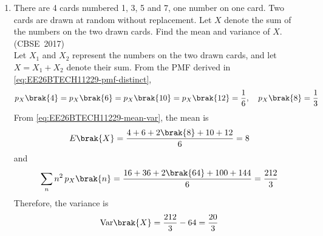 \begin{enumerate}[label=\thesubsection.\arabic*, ref=\thesubsection.\theenumi]
The following code verifies the solution
\begin{lstlisting}[frame=single, basicstyle=\rmfamily, escapeinside={(*@}{@*)}]
(*@\makebox[\dimexpr\linewidth-2\fboxsep-2\fboxrule\relax][c]{codes/triangle.py}@*)
\end{lstlisting}

\item 
There are 4 cards numbered 1, 3, 5 and 7, one number on one card. Two cards are drawn at random without replacement. Let $X$ denote the sum of the numbers on the two drawn cards. Find the mean and variance of $X$.
\hfill (CBSE~2017)
\\
\solution
Let $X_1$ and $X_2$ represent the numbers on the two drawn cards, and let $X = X_1 + X_2$ denote their sum. From the PMF derived in \eqref{eq:EE26BTECH11229-pmf-distinct},
\begin{align}
	p_X\brak{4} = p_X\brak{6} = p_X\brak{10} = p_X\brak{12} = \frac{1}{6}, \quad p_X\brak{8} = \frac{1}{3}
\end{align}
From \eqref{eq:EE26BTECH11229-mean-var}, the mean is
\begin{align}
	E\brak{X} = \frac{4 + 6 + 2\brak{8} + 10 + 12}{6} = 8
\end{align}
and
\begin{align}
	\sum_{n}n^2\,p_X\brak{n} = \frac{16 + 36 + 2\brak{64} + 100 + 144}{6} = \frac{212}{3}
\end{align}
Therefore, the variance is
\begin{align}
	\text{Var}\brak{X} = \frac{212}{3} - 64 = \frac{20}{3}
\end{align}


\end{enumerate}
